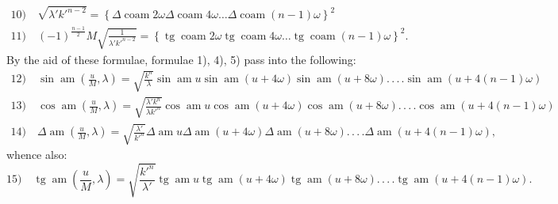 \documentclass{article}
\begin{document}
\[
\begin{gathered}
\text{10)}\quad\sqrt{\lambda'k'^{n-2}}=\left\{\Delta\operatorname{coam}2\omega\Delta\operatorname{coam}4\omega\ldots\Delta\operatorname{coam}(n-1)\omega\right\}^{2}\\[1.5ex]
\text{11)}\quad(-1)^{\frac{n-1}{2}}M\sqrt{\frac{1}{\lambda'k'^{n-2}}}=\left\{\operatorname{tg}\operatorname{coam}2\omega\operatorname{tg}\operatorname{coam}4\omega\ldots\operatorname{tg}\operatorname{coam}(n-1)\omega\right\}^{2}.
\end{gathered}
\]
By the aid of these formulae, formulae 1), 4), 5) pass into the following:
\[
\begin{gathered}
\text{12)}\quad\sin\operatorname{am}\left(\frac{u}{M},\lambda\right)=\sqrt{\frac{k^{n}}{\lambda}}\sin\operatorname{am}u\sin\operatorname{am}(u+4\omega)\sin\operatorname{am}(u+8\omega).\,.\,.\,.\sin\operatorname{am}(u+4(n-1)\omega)\\[1.5ex]
\text{13)}\quad\cos\operatorname{am}\left(\frac{u}{M},\lambda\right)=\sqrt{\frac{\lambda'k^{n}}{\lambda k'^{n}}}\cos\operatorname{am}u\cos\operatorname{am}(u+4\omega)\cos\operatorname{am}(u+8\omega).\,.\,.\,.\cos\operatorname{am}(u+4(n-1)\omega)\\[1.5ex]
\text{14)}\quad\Delta\operatorname{am}\left(\frac{u}{M},\lambda\right)=\sqrt{\frac{\lambda'}{k'^{n}}}\Delta\operatorname{am}u\Delta\operatorname{am}(u+4\omega)\Delta\operatorname{am}(u+8\omega).\,.\,.\,.\Delta\operatorname{am}(u+4(n-1)\omega),
\end{gathered}
\]
whence also:
\[
\text{15)}\quad\operatorname{tg}\operatorname{am}\left(\frac{u}{M},\lambda\right)=\sqrt{\frac{k'^{n}}{\lambda'}}\operatorname{tg}\operatorname{am}u\operatorname{tg}\operatorname{am}(u+4\omega)\operatorname{tg}\operatorname{am}(u+8\omega).\,.\,.\,.\operatorname{tg}\operatorname{am}(u+4(n-1)\omega).
\]
\end{document}
